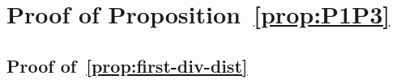 \documentclass[aos]{imsart}
\theoremstyle{plain}
\theoremstyle{remark}
\newcommand{\cnam}[1]{\textcolor{mypurple}{#1}}
\begin{document}
%


\appendix

\section{Proof of Proposition~\ref{prop:P1P3}}\label{appA}

\subsection{Proof \cnam{of~}\ref{prop:first-div-dist}}\label{proof:first-div-dist}
\end{document}
